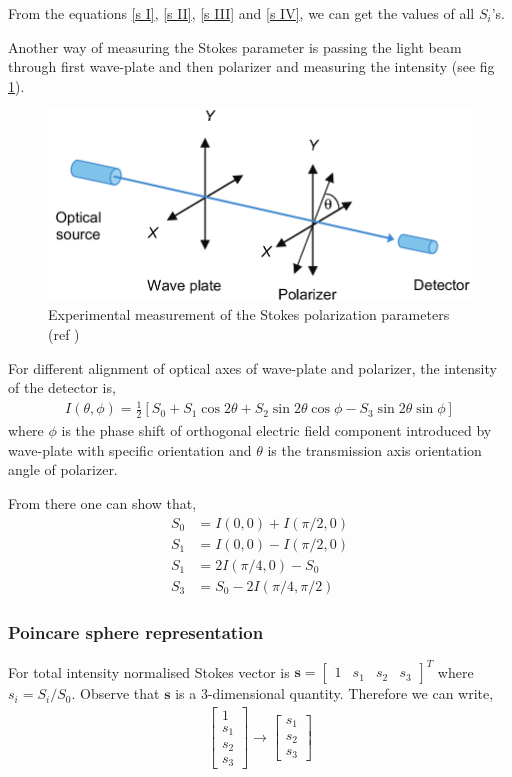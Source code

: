 \documentclass[11pt,a4paper]{article}
\numberwithin{equation}{section}
\begin{document}
From the equations \ref{s I}, \ref{s II}, \ref{s III} and \ref{s IV}, we can get the values of all $S_i$'s.

Another way of measuring the  Stokes parameter is passing the light beam through first wave-plate and then polarizer and measuring the intensity (see fig \ref{fig:stokes-para}).
\begin{figure}[H]
	\centering
	\includegraphics[width=0.6\linewidth]{"stokes para"}
	\caption{Experimental measurement of the Stokes polarization parameters (ref \cite{collett 05}) }
	\label{fig:stokes-para}
\end{figure}
For different alignment of optical axes of wave-plate and polarizer, the intensity of the detector is,
\begin{align}
	I(\theta,\phi) = \frac{1}{2}[S_0+S_1\cos2\theta+S_2\sin2\theta\cos\phi-S_3\sin2\theta\sin\phi]
\end{align}
where $\phi$ is the phase shift of orthogonal electric field component introduced by wave-plate with specific orientation and $\theta$ is the transmission axis orientation angle of polarizer. \cite{goldstein 11}\cite{collett 05}

From there one can show that, 
\begin{align}
	S_0&=I(0,0)+I(\pi/2,0)\\
	S_1&=I(0,0)-I(\pi/2,0)\\
	S_1&=2I(\pi/4,0)-S_0\\
	S_3&=S_0-2I(\pi/4,\pi/2)
\end{align}


\subsubsection{Poincare sphere representation}
For total intensity normalised Stokes vector is $\boldsymbol{s}= \begin{bmatrix} 1& s_1& s_2& s_3\end{bmatrix}^T$ where $s_i=S_i/S_0$. Observe that $ \boldsymbol{s} $ is a 3-dimensional quantity. Therefore we can write, 
\begin{align*}
	\begin{bmatrix} 1\\ s_1\\ s_2\\ s_3\end{bmatrix} \rightarrow 
	\begin{bmatrix} s_1\\ s_2\\ s_3\end{bmatrix}
\end{align*}
\end{document}
